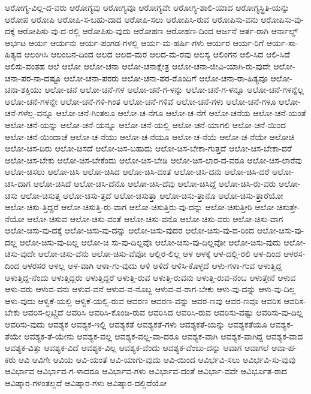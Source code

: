 {ಆರೋಗ್ಯ-ವಿಲ್ಲ-ದ-ವರು
ಆರೋಗ್ಯವು
ಆರೋಗ್ಯವೂ
ಆರೋಗ್ಯವೇ
ಆರೋಗ್ಯ-ಶಾಲಿ-ಯಾದ
ಆರೋಗ್ಯಸ್ಥಿತಿ-ಯನ್ನು
ಆರೋಪ
ಆರೋಪಿ
ಆರೋಪಿ-ಸ-ಬಹು-ದಾದ
ಆರೋಪಿ-ಸಲು
ಆರೋಪಿಸಿ-ರುವ
ಆರೋಪಿಸು-ವನು
ಆರೋಪಿಸು-ವು-ದಕ್ಕೆ
ಆರೋಪಿಸು-ವು-ದ-ರಲ್ಲಿ
ಆರೋಪಿಸು-ವುದು
ಆರೋಹಣ
ಆರೋಹಣ-ದಿಂದ
ಆರ್ಜನೆ
ಆರ್ತ-ರಾಗಿ
ಆರ್ನಾಲ್ಡ್
ಆರ್ಭಟ
ಆರ್ಯ
ಆರ್ಯನು
ಆರ್ಯ-ಪಂಗಡ-ಗಳಲ್ಲಿ
ಆರ್ಯ-ಮ-ಹರ್ಷಿ-ಗಳು
ಆರ್ಯರ
ಆರ್ಯ-ರಿಗೆ
ಆರ್ಯ-ಸಾ-ಹಿತ್ಯದ
ಆಲಂಗಿಸಿ
ಆಲಂಬನ-ದಿಂದ
ಆಲದ
ಆಲದ-ಮರ
ಆಲದ-ಮ-ರವು
ಆಲಸ್ಯ
ಆಲಿಂಗನ
ಆಲಿ-ಸಿದ
ಆಲಿ-ಸಿದೆ
ಆಲಿಸು-ವಂತಹ
ಆಲೆ
ಆಲೋ
ಆಲೋ-ಚನಾ
ಆಲೋ-ಚನಾಕ್ಷೇತ್ರ
ಆಲೋ-ಚನಾ-ಜೀವಿ-ಯಾಗಿ-ರು-ವುದೇ
ಆಲೋ-ಚನಾ-ಪರ-ನಾ-ದಷ್ಟೂ
ಆಲೋ-ಚನಾ-ಪರರು
ಆಲೋ-ಚನಾ-ಪರ-ರೊಂದಿಗೆ
ಆಲೋ-ಚನಾ-ರಾ-ಹಿತ್ಯವೂ
ಆಲೋ-ಚನಾ-ಶಕ್ತಿಯು
ಆಲೋ-ಚನೆ
ಆಲೋ-ಚನೆ-ಗಳ
ಆಲೋ-ಚನೆ-ಗ-ಳನ್ನು
ಆಲೋ-ಚನೆ-ಗ-ಳನ್ನೂ
ಆಲೋ-ಚನೆ-ಗಳನ್ನೆಲ್ಲ
ಆಲೋ-ಚನೆ-ಗಳನ್ನೇ
ಆಲೋ-ಚನೆ-ಗಳಿ-ಗಿಂತ
ಆಲೋ-ಚನೆ-ಗಳಿವೆ
ಆಲೋ-ಚನೆ-ಗಳು
ಆಲೋ-ಚನೆ-ಗಳೂ
ಆಲೋ-ಚನೆ-ಗಳೆಲ್ಲ-ವನ್ನೂ
ಆಲೋ-ಚನೆ-ಗಿಂತಲೂ
ಆಲೋ-ಚ-ನೆಗೂ
ಆಲೋ-ಚ-ನೆಗೆ
ಆಲೋ-ಚನೆಯ
ಆಲೋ-ಚನೆ-ಯಂತೆ
ಆಲೋ-ಚನೆ-ಯನ್ನು
ಆಲೋ-ಚನೆ-ಯನ್ನೂ
ಆಲೋ-ಚನೆ-ಯಲ್ಲಿ
ಆಲೋ-ಚನೆ-ಯಾಗಲಿ
ಆಲೋ-ಚನೆ-ಯಿಂದ
ಆಲೋ-ಚನೆ-ಯಿಂದಾಚೆ
ಆಲೋ-ಚ-ನೆಯು
ಆಲೋ-ಚ-ನೆಯೂ
ಆಲೋ-ಚ-ನೆಯೆ
ಆಲೋ-ಚ-ನೆಯೇ
ಆಲೋಚಿ
ಆಲೋ-ಚಿಸ-ದಿರು
ಆಲೋ-ಚಿಸದೆ
ಆಲೋ-ಚಿಸ-ಬಹುದು
ಆಲೋ-ಚಿಸ-ಬೇಕಾ-ಗುತ್ತದೆ
ಆಲೋ-ಚಿಸ-ಬೇಕಾ-ದರೆ
ಆಲೋ-ಚಿಸ-ಬೇಕು
ಆಲೋ-ಚಿಸ-ಬೇಕೆಂದು
ಆಲೋ-ಚಿಸ-ಬೇಡಿ
ಆಲೋ-ಚಿಸ-ಲಾರ-ದ-ವರೂ
ಆಲೋ-ಚಿಸ-ಲಾರೆವು
ಆಲೋ-ಚಿಸಲು
ಆಲೋ-ಚಿಸಿ
ಆಲೋ-ಚಿಸಿದ
ಆಲೋ-ಚಿಸಿ-ದಂತೆ
ಆಲೋ-ಚಿಸಿ-ದನು
ಆಲೋ-ಚಿಸಿ-ದರೆ
ಆಲೋ-ಚಿಸಿ-ದಾಗ
ಆಲೋ-ಚಿಸಿದೆ
ಆಲೋ-ಚಿಸಿ-ದೆನೊ
ಆಲೋ-ಚಿಸಿ-ದೆವು
ಆಲೋ-ಚಿಸಿದ್ದೆ
ಆಲೋ-ಚಿಸಿ-ರು-ವರು
ಆಲೋ-ಚಿಸು
ಆಲೋ-ಚಿಸುತ್ತ
ಆಲೋ-ಚಿಸು-ತ್ತದೆ
ಆಲೋ-ಚಿಸುತ್ತಾ
ಆಲೋ-ಚಿಸು-ತ್ತಾನೊ
ಆಲೋ-ಚಿಸು-ತ್ತಾರೆಯೋ
ಆಲೋ-ಚಿಸು-ತ್ತಿದ್ದರೆ
ಆಲೋ-ಚಿಸುತ್ತಿ-ರು-ವಾಗ
ಆಲೋ-ಚಿಸುತ್ತಿರು-ವು-ದನ್ನು
ಆಲೋ-ಚಿಸುತ್ತೀರಿ
ಆಲೋ-ಚಿಸುತ್ತೇ-ನೆಯೋ
ಆಲೋ-ಚಿಸುವ
ಆಲೋ-ಚಿಸು-ವಂತೆ
ಆಲೋ-ಚಿಸು-ವನೊ
ಆಲೋ-ಚಿಸು-ವರು
ಆಲೋ-ಚಿಸು-ವಾಗ
ಆಲೋ-ಚಿಸು-ವು-ದಕ್ಕೆ
ಆಲೋ-ಚಿಸು-ವು-ದನ್ನು
ಆಲೋ-ಚಿಸು-ವುದರ
ಆಲೋ-ಚಿಸು-ವು-ದ-ರಿಂದ
ಆಲೋ-ಚಿಸು-ವು-ದಲ್ಲ
ಆಲೋ-ಚಿಸು-ವು-ದಿಲ್ಲ
ಆಲೋ-ಚಿ ಸು-ವು-ದಿಲ್ಲವೊ
ಆಲೋ-ಚಿಸು-ವು-ದಿಲ್ಲವೋ
ಆಲೋ-ಚಿಸು-ವುದು
ಆಲೋ-ಚಿಸು-ವುದೇ
ಆಲೋ-ಚಿಸು-ವೆನು
ಆಲೋ-ಚಿಸು-ವೆವೋ
ಆಲ್ಲಿರ-ಲಿಲ್ಲ
ಆಳ
ಆಳಕ್ಕೆ
ಆಳ-ದಲ್ಲಿ-ರಲಿ
ಆಳ-ದಿಂದ
ಆಳರಸ-ದಿಂದ
ಆಳರಸರ
ಆಳಲ್ಲ
ಆಳ-ವಾಗಿ
ಆಳಾ-ಗು-ವುದು
ಆಳಿ
ಆಳಿದೆ
ಆಳಿಸಿ-ಕೊಳ್ಳದೆ
ಆಳು-ಗಳಾ-ಗುವ
ಆಳುತ್ತಿದ್ದ
ಆಳುತ್ತಿದ್ದ-ನೆಂದು
ಆಳುತ್ತಿದ್ದರು
ಆಳುತ್ತಿದ್ದರೆ
ಆಳುತ್ತಿ-ರುವ
ಆಳುತ್ತಿ-ರುವನು
ಆಳುತ್ತಿ-ರುವ-ನೆಂಬ
ಆಳುತ್ತೇನೆ
ಆಳುವ
ಆಳು-ವರು
ಆಳುವ-ವನು
ಆಳುವ-ವನೆ
ಆಳುವ-ವ-ನೊಬ್ಬ
ಆಳುವ-ವ-ರಾಗ-ಬೇಕು
ಆಳು-ವು-ದನ್ನು
ಆಳು-ವು-ದಿಲ್ಲ
ಆಳು-ವುದು
ಆಳ್ವಿಕೆ-ಯಲ್ಲಿ
ಆಳ್ವಿಕೆ-ಯಲ್ಲಿ-ರುವ
ಆವರಣ
ಆವರಣ-ವನ್ನು
ಆವರ-ಣವು
ಆವರ-ಣವೂ
ಆವರಿಸ
ಆವರಿಸ-ಬೇಕು
ಆವರಿಸ-ಲ್ಪಟ್ಚಿದೆ
ಆವರಿಸಿ
ಆವರಿಸಿ-ಕೊಂಡಿ-ರುವ
ಆವರಿಸಿದ
ಆವರಿಸಿ-ರುವ
ಆವರಿಸು-ವಷ್ಟು
ಆವರಿಸು-ವು-ದಿಲ್ಲ
ಆವರಿಸು-ವುದು
ಆವಶ್ಯಕ
ಆವಶ್ಯಕ-ಇಲ್ಲಿ
ಆವಶ್ಯಕತೆ
ಆವಶ್ಯಕತೆ-ಗಳು
ಆವಶ್ಯಕತೆ-ಯನ್ನು
ಆವಶ್ಯಕತೆಯೂ
ಆವಶ್ಯಕ-ತೆಯೇ
ಆವಶ್ಯಕ-ತೆ-ಯೇನು
ಆವಶ್ಯಕ-ವಲ್ಲ
ಆವಶ್ಯಕ-ವಲ್ಲ-ವಾ-ದರೂ
ಆವಶ್ಯಕ-ವಾಗಿ
ಆವಶ್ಯಕ-ವಾಗಿದ್ದ
ಆವಶ್ಯಕ-ವಾದ
ಆವಶ್ಯಕ-ವಿತ್ತು
ಆವಶ್ಯಕ-ವಿದೆ
ಆವಶ್ಯಕ-ವಿಲ್ಲ
ಆವಶ್ಯಕ-ವೆಂದು
ಆವಶ್ಯಕ-ವೆಂಬು-ದನ್ನು
ಆವಾಗ
ಆವಾಗಲೆ
ಆವಾ-ಹ-ಕರು
ಆವಿ
ಆವಿಗೇ
ಆವಿಯ
ಆವಿ-ಯಂತೆ
ಆವಿ-ಯಾಗು-ವುದು
ಆವಿ-ಯಿಂದ
ಆವಿರ್ಭವಿ-ಸಲು
ಆವಿರ್ಭವಿ-ಸು-ವುವು
ಆವಿರ್ಭಾವ
ಆವಿರ್ಭಾವ-ಗ-ಳಾದರೂ
ಆವಿರ್ಭಾವ-ಗಳು
ಆವಿರ್ಭಾವ-ದಂತೆ
ಆವಿರ್ಭಾ-ವವೇ
ಆವಿರ್ಭೂತ-ರಾದ
ಆವಿಷ್ಕಾರ-ಗಳಂತಲ್ಲದೆ
ಆವಿಷ್ಕಾರ-ಗಳು
ಆವಿಷ್ಕಾರ-ದಲ್ಲಿದೆಯೋ
}
